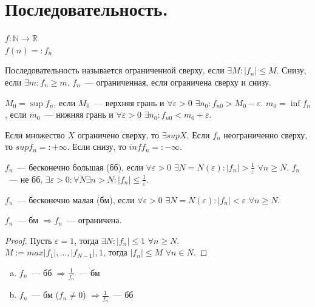 \documentclass[12pt]{article}
\begin{document}
	\tableofcontents
	\setcounter{tocdepth}{3}
	\newpage
	\section{Последовательность.}
	$f: \mathbb{N} \rightarrow \mathbb{R}$ \\
	$f(n) =: f_n$
	\begin{definition}
		Последовательность называется ограниченной сверху, если $\exists M: |f_n| \leqslant M$. Снизу, если $\exists m:  f_n \geqslant m$. $f_n$~--- ограниченная, если ограничена сверху и снизу.
	\end{definition}
	\begin{definition}
		$M_0 = \sup f_n$, если $M_0$~--- верхняя грань и $\forall \varepsilon > 0$ $\exists n_0: f_{n0} > M_0 - \varepsilon$. $m_0 = \inf f_n$, если $m_0$~--- нижняя грань и $\forall \varepsilon > 0$ $\exists n_0: f_{n0} < m_0 + \varepsilon$.
	\end{definition}
	\begin{axiom}
		Если множество $X$ ограничено сверху, то $\exists sup X$. Если $f_n$ неограниченно сверху, то $sup f_n =: + \infty$. Если снизу, то $inf f_n =: - \infty$.
	\end{axiom}
	\begin{definition}
		$f_n$~--- бесконечно большая (бб), если $\forall \varepsilon > 0$ $\exists N = N(\varepsilon): |f_n| > \frac{1}{\varepsilon}$ $\forall n \geqslant N$. $f_n$~--- не бб, $\exists \varepsilon > 0: \forall N \exists n > N: |f_n| \leqslant \frac{1}{\varepsilon}$.
	\end{definition}
	\begin{definition}
		$f_n$~--- бесконечно малая (бм), если $\forall \varepsilon > 0$ $\exists N = N(\varepsilon): |f_n| <\varepsilon$ $\forall n \geqslant N$.
	\end{definition}
	\begin{lemma}
		$f_n$~--- бм $\Rightarrow f_n$~--- ограничена.
	\end{lemma}
	\begin{proof}
		Пусть $\varepsilon = 1$, тогда $\exists N: |f_n| \leqslant 1$ $\forall n \geqslant N$. \\
		$M := max{|f_1|, \dots, |f_{N - 1}|, 1}$, тогда $|f_n| \leqslant M$ $\forall n \in N$.
	\end{proof}
	\begin{lemma}
		\begin{enumerate}[a)]
			\item $f_n$~--- бб $\Rightarrow \frac{1}{f_n}$~--- бм
			\item $f_n$~--- бм ($f_n \not= 0$) $\Rightarrow \frac{1}{f_n}$~--- бб
		\end{enumerate}
	\end{lemma}
\end{document}
